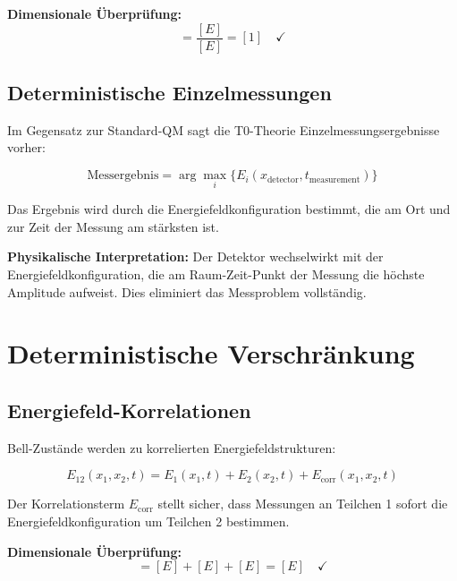 \documentclass[12pt,a4paper]{report}
\begin{document}
	\textbf{Dimensionale Überprüfung:}
	\begin{equation}
		[R_i] = \frac{[E]}{[E]} = [1] \quad \checkmark
	\end{equation}
	
	\subsection{Deterministische Einzelmessungen}
	\label{subsec:deterministic_measurements}
	
	Im Gegensatz zur Standard-QM sagt die T0-Theorie Einzelmessungsergebnisse vorher:
	
	\begin{equation}
		\text{Messergebnis} = \arg\max_i\{E_i(x_{\text{detector}}, t_{\text{measurement}})\}
	\end{equation}
	
	Das Ergebnis wird durch die Energiefeldkonfiguration bestimmt, die am Ort und zur Zeit der Messung am stärksten ist.
	
	\textbf{Physikalische Interpretation:}
	Der Detektor wechselwirkt mit der Energiefeldkonfiguration, die am Raum-Zeit-Punkt der Messung die höchste Amplitude aufweist. Dies eliminiert das Messproblem vollständig.
	
	\section{Deterministische Verschränkung}
	\label{sec:deterministic_entanglement}
	
	\subsection{Energiefeld-Korrelationen}
	\label{subsec:energy_field_correlations}
	
	Bell-Zustände werden zu korrelierten Energiefeldstrukturen:
	
	\begin{equation}
		E_{12}(x_1,x_2,t) = E_1(x_1,t) + E_2(x_2,t) + E_{\text{corr}}(x_1,x_2,t)
	\end{equation}
	
	Der Korrelationsterm $E_{\text{corr}}$ stellt sicher, dass Messungen an Teilchen 1 sofort die Energiefeldkonfiguration um Teilchen 2 bestimmen.
	
	\textbf{Dimensionale Überprüfung:}
	\begin{equation}
		[E_{12}] = [E] + [E] + [E] = [E] \quad \checkmark
	\end{equation}
	
\end{document}
